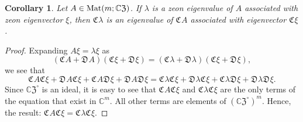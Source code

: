 \documentclass{article}
\newtheorem{corollary}[theorem]{Corollary}
\theoremstyle{definition}
\newcommand{\zco}{\mathfrak{C}\mspace{1mu}}
\newcommand{\zdu}{\mathfrak{D}\mspace{1mu}}
\newcommand{\CZ}{\mathbb{C}\mathfrak{Z}}
\newcommand{\Mat}{{\rm Mat}}
\numberwithin{equation}{section}
\begin{document}
\begin{corollary}
Let $A\in\Mat(m;\CZ)$.  If $\lambda$ is a zeon eigenvalue of $A$ associated with zeon eigenvector $\xi$,  then $\zco \lambda$ is an eigenvalue of $\zco A$ associated with eigenvector $\zco \xi$.
\end{corollary}

\begin{proof}
Expanding $A\xi=\lambda\xi$ as 
\begin{equation*}
(\zco A+\zdu A)(\zco \xi+\zdu \xi)=(\zco \lambda +\zdu \lambda)(\zco \xi +\zdu \xi),
\end{equation*}
we see that \begin{equation*}
\zco A\zco \xi+\zdu A\zco \xi+\zco A\zdu \xi+\zdu A\zdu \xi=\zco \lambda \zco \xi+\zdu \lambda \zco \xi+\zco \lambda\zdu \xi+\zdu \lambda\zdu \xi.
\end{equation*}
Since ${\CZ}^\circ$ is an ideal, it is easy to see that $\zco A\zco \xi$ and $\zco \lambda \zco \xi$ are the only terms of the equation that exist in $\mathbb{C}^m$.  All other terms are elements of $({\CZ}^\circ)^m$.  Hence, the result: $\zco A\zco \xi=\zco \lambda \zco \xi$.
\end{proof}
\end{document}
